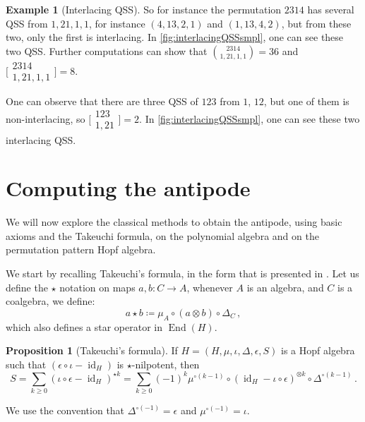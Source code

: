 \documentclass[12pt, reqno]{amsart}
\theoremstyle{definition}
\newtheorem{prop}[thm]{Proposition}
\newtheorem{smpl}[thm]{Example}
\DeclareMathOperator{\id}{id}
\DeclareMathOperator{\End}{\mathrm{End}}
\begin{document}
\begin{smpl}[Interlacing QSS]
So for instance the permutation $2314$ has several QSS from $1, 21, 1, 1$, for instance $(4, 13, 2, 1)$ and $(1, 13, 4, 2)$, but from these two, only the first is interlacing.
In \cref{fig:interlacingQSSsmpl}, one can see these two QSS.
Further computations can show that $\binom{2314}{1, 21, 1, 1} = 36$ and $\bigl[\!\begin{smallmatrix} 2314 \\ 1, 21, 1, 1 \end{smallmatrix}\!\bigr] = 8$.

One can observe that there are three QSS of $123$ from $1$, $12$, but one of them is non-interlacing, so
$\bigl[\!\begin{smallmatrix} 123 \\ 1, 21 \end{smallmatrix}\!\bigr] = 2$.
In \cref{fig:interlacingQSSsmpl}, one can see these two interlacing QSS.
\end{smpl}


\section{Computing the antipode\label{sec:antipode_computing}}

We will now explore the classical methods to obtain the antipode, using basic axioms and the Takeuchi formula, on the polynomial algebra and on the permutation pattern Hopf algebra.

We start by recalling Takeuchi's formula, in the form that is presented in \cite{GrinbergReiner}.
Let us define the $\star$ notation on maps $a, b: C \to A$, whenever $A$ is an algebra, and $C$ is a coalgebra, we define:
$$a \star b \coloneqq \mu_A \circ (a \otimes b) \circ \Delta_C\, ,$$
which also defines a star operator in $\End(H)$.

\begin{prop}[Takeuchi's formula]\label{lm:takeuchi}
If $H = (H, \mu, \iota, \Delta, \epsilon, S)$ is a Hopf algebra such that $(\epsilon\circ \iota - \id_H)$ is $\star$-nilpotent, then 
\begin{equation}\label{eq:eq1}
S = \sum_{k\geq 0 }  ( \iota  \circ\epsilon- \id_H)^{\star k} = \sum_{k\geq 0} (-1)^k \mu^{\circ (k-1)} \circ (\id_{H} - \iota \circ \epsilon)^{\otimes k} \circ \Delta^{\circ (k-1)}\, .
\end{equation}

We use the convention that $\Delta^{\circ (-1)} = \epsilon $ and $\mu^{\circ (-1)} = \iota$.
\end{prop}
\end{document}
